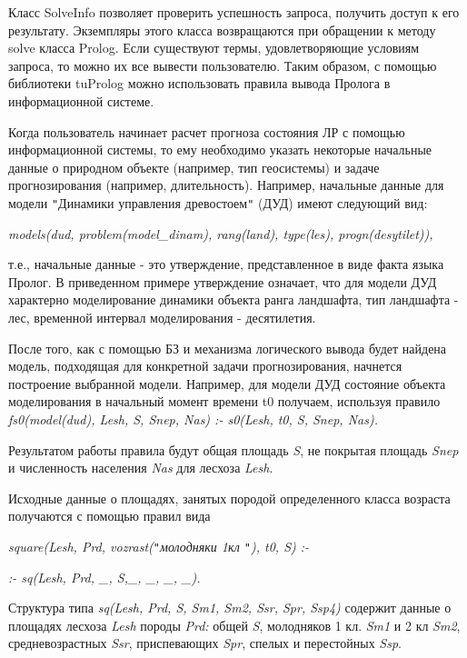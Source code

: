 \documentclass{article}
\begin{document}
Класс SolveInfo позволяет проверить успешность 
запроса, получить доступ к его результату. Экземпляры 
этого класса возвращаются при обращении к методу 
solve класса Prolog. Если существуют термы, удовлетворяющие 
условиям запроса, то можно их все вывести пользователю. 
Таким образом, с помощью библиотеки tuProlog можно 
использовать правила вывода Пролога в информационной 
системе. 

Когда пользователь начинает расчет прогноза 
состояния ЛР с помощью информационной системы, 
то ему необходимо указать некоторые начальные 
данные о природном объекте (например, тип геосистемы) 
и задаче прогнозирования (например, длительность). 
Например, начальные данные для модели \texttt{"}Динамики 
управления древостоем\texttt{"} (ДУД) имеют следующий 
вид:

\textit{models(dud, problem(model\_dinam), rang(land), type(les), progn(desytilet)),}

т.е., начальные данные - это утверждение, представленное 
в виде факта языка Пролог. В приведенном примере 
утверждение означает, что для модели ДУД  характерно 
моделирование динамики объекта ранга ландшафта, 
 тип ландшафта - лес, временной интервал моделирования 
- десятилетия.

После того, как с помощью БЗ и механизма логического 
вывода будет найдена модель, подходящая для 
конкретной задачи прогнозирования, начнется 
построение выбранной модели. Например, для 
модели ДУД состояние объекта моделирования 
в начальный момент времени t0  получаем, используя 
правило
\textit{fs0(model(dud), Lesh, S, Snep, Nas) :- s0(Lesh, t0, S, Snep, Nas).}

Результатом работы правила будут общая площадь 
\textit{S}, не покрытая площадь \textit{Snep} и численность 
населения \textit{Nas} для лесхоза \textit{Lesh}.

Исходные данные о площадях, занятых породой 
определенного класса возраста получаются с 
помощью правил вида

\begin{center}
\textit{square(Lesh, Prd, vozrast(\texttt{"}молодняки 1кл \texttt{"}), 
t0, S) :-}

\textit{:- sq(Lesh, Prd, \_, S,\_, \_, \_, \_).}
\end{center}

Структура типа \textit{sq(Lesh, Prd, S, Sm1, Sm2, Ssr, Spr, Ssp4) 
}содержит данные о площадях лесхоза \textit{Lesh} 
породы \textit{Prd:} общей \textit{S}, молодняков 1 кл. 
\textit{Sm1} и 2 кл \textit{Sm2}, средневозрастных \textit{Ssr}, 
приспевающих \textit{Spr}, спелых и перестойных \textit{Ssp}.
\end{document}

